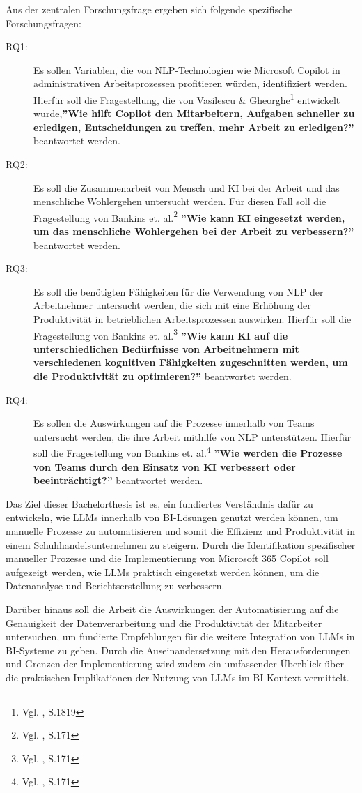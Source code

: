 Aus der zentralen Forschungsfrage ergeben sich folgende spezifische Forschungsfragen:
\begin{description}
    \item[RQ1:] Es sollen Variablen, die von NLP-Technologien wie Microsoft Copilot in administrativen Arbeitsprozessen profitieren würden, identifiziert werden. Hierfür soll die Fragestellung, die von Vasilescu \& Gheorghe\footnote{Vgl. \cite{Vasilescu2024}, S.1819} entwickelt wurde,\textbf{''Wie hilft Copilot den Mitarbeitern, Aufgaben schneller zu erledigen, Entscheidungen zu treffen, mehr Arbeit zu erledigen?''} beantwortet werden.
    \item[RQ2:] Es soll die Zusammenarbeit von Mensch und KI bei der Arbeit und das menschliche Wohlergehen untersucht werden. Für diesen Fall soll die Fragestellung von Bankins et. al.\footnote{Vgl. \cite{Bankins2024}, S.171} \textbf{''Wie kann KI eingesetzt werden, um das menschliche Wohlergehen bei der Arbeit zu verbessern?''} beantwortet werden.
    \item[RQ3:] Es soll die benötigten Fähigkeiten für die Verwendung von NLP der Arbeitnehmer untersucht werden, die sich mit eine Erhöhung der Produktivität in betrieblichen Arbeitsprozessen auswirken. Hierfür soll die Fragestellung von Bankins et. al.\footnote{Vgl. \cite{Bankins2024}, S.171} \textbf{''Wie kann KI auf die unterschiedlichen Bedürfnisse von Arbeitnehmern mit verschiedenen kognitiven Fähigkeiten zugeschnitten werden, um die Produktivität zu optimieren?''} beantwortet werden. 
    \item[RQ4:] Es sollen die Auswirkungen auf die Prozesse innerhalb von Teams untersucht werden, die ihre Arbeit mithilfe von NLP unterstützen. Hierfür soll die Fragestellung von Bankins et. al.\footnote{Vgl. \cite{Bankins2024}, S.171} \textbf{''Wie werden die Prozesse von Teams durch den Einsatz von KI verbessert oder beeinträchtigt?''} beantwortet werden. 
\end{description}

Das Ziel dieser Bachelorthesis ist es, ein fundiertes Verständnis dafür zu entwickeln, wie LLMs innerhalb von BI-Lösungen genutzt werden können, um manuelle Prozesse zu automatisieren und somit die Effizienz und Produktivität in einem Schuhhandelsunternehmen zu steigern. Durch die Identifikation spezifischer manueller Prozesse und die Implementierung von Microsoft 365 Copilot soll aufgezeigt werden, wie LLMs praktisch eingesetzt werden können, um die Datenanalyse und Berichtserstellung zu verbessern.

Darüber hinaus soll die Arbeit die Auswirkungen der Automatisierung auf die Genauigkeit der Datenverarbeitung und die Produktivität der Mitarbeiter untersuchen, um fundierte Empfehlungen für die weitere Integration von LLMs in BI-Systeme zu geben. Durch die Auseinandersetzung mit den Herausforderungen und Grenzen der Implementierung wird zudem ein umfassender Überblick über die praktischen Implikationen der Nutzung von LLMs im BI-Kontext vermittelt.

\clearpage